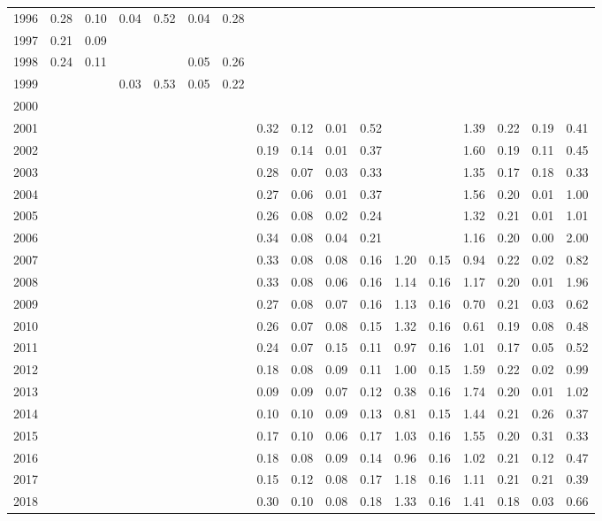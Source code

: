 \documentclass[12pt,]{article}
\begin{document}
\begin{table}[ht]
{\begin{tabular}{rrrrrrrrrrrrrrrrr}
  1996 & 0.28 & 0.10 & 0.04 & 0.52 & 0.04 & 0.28 &  &  &  &  &  &  &  &  &  &  \\ 
  1997 & 0.21 & 0.09 &  &  &  &  &  &  &  &  &  &  &  &  &  &  \\ 
  1998 & 0.24 & 0.11 &  &  & 0.05 & 0.26 &  &  &  &  &  &  &  &  &  &  \\ 
  1999 &  &  & 0.03 & 0.53 & 0.05 & 0.22 &  &  &  &  &  &  &  &  &  &  \\ 
  2000 &  &  &  &  &  &  &  &  &  &  &  &  &  &  &  &  \\ 
  2001 &  &  &  &  &  &  & 0.32 & 0.12 & 0.01 & 0.52 &  &  & 1.39 & 0.22 & 0.19 & 0.41 \\ 
  2002 &  &  &  &  &  &  & 0.19 & 0.14 & 0.01 & 0.37 &  &  & 1.60 & 0.19 & 0.11 & 0.45 \\ 
  2003 &  &  &  &  &  &  & 0.28 & 0.07 & 0.03 & 0.33 &  &  & 1.35 & 0.17 & 0.18 & 0.33 \\ 
  2004 &  &  &  &  &  &  & 0.27 & 0.06 & 0.01 & 0.37 &  &  & 1.56 & 0.20 & 0.01 & 1.00 \\ 
  2005 &  &  &  &  &  &  & 0.26 & 0.08 & 0.02 & 0.24 &  &  & 1.32 & 0.21 & 0.01 & 1.01 \\ 
  2006 &  &  &  &  &  &  & 0.34 & 0.08 & 0.04 & 0.21 &  &  & 1.16 & 0.20 & 0.00 & 2.00 \\ 
  2007 &  &  &  &  &  &  & 0.33 & 0.08 & 0.08 & 0.16 & 1.20 & 0.15 & 0.94 & 0.22 & 0.02 & 0.82 \\ 
  2008 &  &  &  &  &  &  & 0.33 & 0.08 & 0.06 & 0.16 & 1.14 & 0.16 & 1.17 & 0.20 & 0.01 & 1.96 \\ 
  2009 &  &  &  &  &  &  & 0.27 & 0.08 & 0.07 & 0.16 & 1.13 & 0.16 & 0.70 & 0.21 & 0.03 & 0.62 \\ 
  2010 &  &  &  &  &  &  & 0.26 & 0.07 & 0.08 & 0.15 & 1.32 & 0.16 & 0.61 & 0.19 & 0.08 & 0.48 \\ 
  2011 &  &  &  &  &  &  & 0.24 & 0.07 & 0.15 & 0.11 & 0.97 & 0.16 & 1.01 & 0.17 & 0.05 & 0.52 \\ 
  2012 &  &  &  &  &  &  & 0.18 & 0.08 & 0.09 & 0.11 & 1.00 & 0.15 & 1.59 & 0.22 & 0.02 & 0.99 \\ 
  2013 &  &  &  &  &  &  & 0.09 & 0.09 & 0.07 & 0.12 & 0.38 & 0.16 & 1.74 & 0.20 & 0.01 & 1.02 \\ 
  2014 &  &  &  &  &  &  & 0.10 & 0.10 & 0.09 & 0.13 & 0.81 & 0.15 & 1.44 & 0.21 & 0.26 & 0.37 \\ 
  2015 &  &  &  &  &  &  & 0.17 & 0.10 & 0.06 & 0.17 & 1.03 & 0.16 & 1.55 & 0.20 & 0.31 & 0.33 \\ 
  2016 &  &  &  &  &  &  & 0.18 & 0.08 & 0.09 & 0.14 & 0.96 & 0.16 & 1.02 & 0.21 & 0.12 & 0.47 \\ 
  2017 &  &  &  &  &  &  & 0.15 & 0.12 & 0.08 & 0.17 & 1.18 & 0.16 & 1.11 & 0.21 & 0.21 & 0.39 \\ 
  2018 &  &  &  &  &  &  & 0.30 & 0.10 & 0.08 & 0.18 & 1.33 & 0.16 & 1.41 & 0.18 & 0.03 & 0.66 \\ 
   \hline
  \end{tabular}
}
\end{table}
\end{document}
